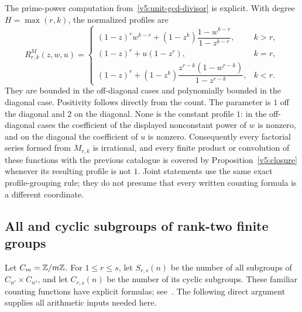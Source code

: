 The prime-power computation from~\eqref{v5:unit-gcd-divisor} is explicit.
With degree $H=\max(r,k)$, the normalized profiles are
\begin{equation}\label{v5:unit-gcd-profiles}
 R^M_{r,k}(z,w,u)=
 \begin{cases}
 (1-z)^r w^{k-r}+
       (1-z^k)\dfrac{1-w^{k-r}}{1-z^{k-r}},&k>r,\\[6pt]
 (1-z)^r+u(1-z^r),&k=r,\\[6pt]
 (1-z)^r+
       (1-z^k)\dfrac{z^{r-k}(1-w^{r-k})}{1-z^{r-k}},&k<r.
 \end{cases}
\end{equation}
They are bounded in the off-diagonal cases and polynomially bounded
in the diagonal case.  Positivity follows directly from the count.
The parameter is $1$ off the diagonal and $2$ on the diagonal.  None
is the constant profile $1$: in the off-diagonal cases the coefficient
of the displayed nonconstant power of $w$ is nonzero, and on the
diagonal the coefficient of $u$ is nonzero.
Consequently every factorial series formed from $M_{r,k}$ is irrational,
and every finite product or convolution of these functions with the
previous catalogue is covered by Proposition~\ref{v5:closure} whenever
its resulting profile is not $1$.  Joint statements use the same exact
profile-grouping rule; they do not presume that every written counting
formula is a different coordinate.

\subsection{All and cyclic subgroups of rank-two finite groups}

Let $C_m=\mathbb Z/m\mathbb Z$.  For $1\leq r\leq s$, let $S_{r,s}(n)$ be the
number of all subgroups of $C_{n^r}\times C_{n^s}$, and let $C_{r,s}(n)$
be the number of its cyclic subgroups.  These familiar counting functions
have explicit formulas; see~\cite{Hampejs14}.  The following direct
argument supplies all arithmetic inputs needed here.

